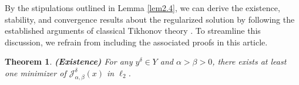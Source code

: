 \documentclass[a4paper,12pt]{article}
\newtheorem{theorem}{Theorem}[section]
\numberwithin{equation}{section}
\newenvironment{proof}[1][Proof]{\textbf{#1.} }
{\ \rule{0.75em}{0.75em}\smallskip}
\begin{document}
\par By the stipulations outlined in Lemma \ref{lem2.4}, we can derive the existence, stability, and convergence results about the regularized solution by following the established arguments of classical Tikhonov theory \cite{EHN96, IJ14}. To streamline this discussion, we refrain from including the associated proofs in this article.

\begin{theorem}\label{the2.6}
    \textbf{(Existence)} For any $y^{\delta}\in Y$ and $\alpha>\beta> 0$, there exists at least one minimizer of $\mathcal{J}_{\alpha,\beta}^{\delta}\left(x\right)$ in $\ell_{2}$.
\end{theorem}

\end{document}
